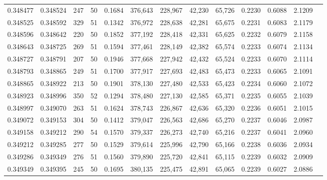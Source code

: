 \begin{tabular}{rrrrrrrrrrrrr}
0.348477 & 0.348524 &   247 &  50 &                                     0.1684 & 376,643 & 228,967 &  42,230 &  65,726 & 0.2230 & 0.6088 & 2.1209 \\
0.348525 & 0.348592 &   329 &  51 &                                     0.1342 & 376,972 & 228,638 &  42,281 &  65,675 & 0.2231 & 0.6083 & 2.1179 \\
0.348596 & 0.348642 &   220 &  50 &                                     0.1852 & 377,192 & 228,418 &  42,331 &  65,625 & 0.2232 & 0.6079 & 2.1158 \\
0.348643 & 0.348725 &   269 &  51 &                                     0.1594 & 377,461 & 228,149 &  42,382 &  65,574 & 0.2233 & 0.6074 & 2.1134 \\
0.348727 & 0.348791 &   207 &  50 &                                     0.1946 & 377,668 & 227,942 &  42,432 &  65,524 & 0.2233 & 0.6070 & 2.1114 \\
0.348793 & 0.348865 &   249 &  51 &                                     0.1700 & 377,917 & 227,693 &  42,483 &  65,473 & 0.2233 & 0.6065 & 2.1091 \\
0.348865 & 0.348922 &   213 &  50 &                                     0.1901 & 378,130 & 227,480 &  42,533 &  65,423 & 0.2234 & 0.6060 & 2.1072 \\
0.348923 & 0.348996 &   350 &  52 &                                     0.1294 & 378,480 & 227,130 &  42,585 &  65,371 & 0.2235 & 0.6055 & 2.1039 \\
0.348997 & 0.349070 &   263 &  51 &                                     0.1624 & 378,743 & 226,867 &  42,636 &  65,320 & 0.2236 & 0.6051 & 2.1015 \\
0.349072 & 0.349153 &   304 &  50 &                                     0.1412 & 379,047 & 226,563 &  42,686 &  65,270 & 0.2237 & 0.6046 & 2.0987 \\
0.349158 & 0.349212 &   290 &  54 &                                     0.1570 & 379,337 & 226,273 &  42,740 &  65,216 & 0.2237 & 0.6041 & 2.0960 \\
0.349212 & 0.349285 &   277 &  50 &                                     0.1529 & 379,614 & 225,996 &  42,790 &  65,166 & 0.2238 & 0.6036 & 2.0934 \\
0.349286 & 0.349349 &   276 &  51 &                                     0.1560 & 379,890 & 225,720 &  42,841 &  65,115 & 0.2239 & 0.6032 & 2.0909 \\
0.349349 & 0.349395 &   245 &  50 &                                     0.1695 & 380,135 & 225,475 &  42,891 &  65,065 & 0.2239 & 0.6027 & 2.0886 \\

\end{tabular}
